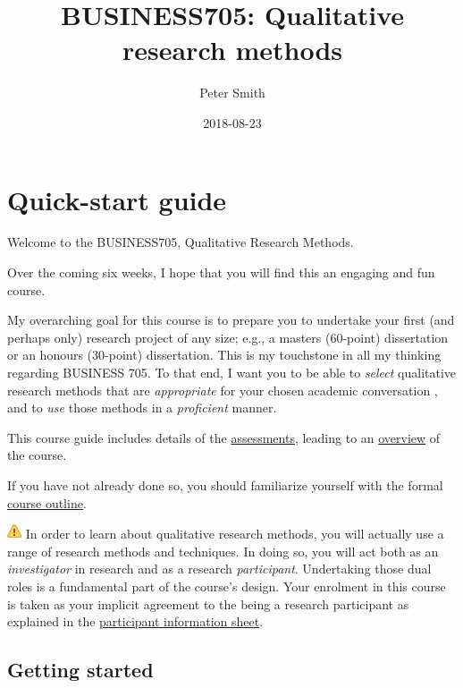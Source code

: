 \documentclass[]{book}
\title{BUSINESS705: Qualitative research methods}
\author{Peter Smith}
\date{2018-08-23}
\theoremstyle{definition}
\theoremstyle{definition}
\theoremstyle{definition}
\theoremstyle{remark}
\begin{document}
\maketitle

{
\setcounter{tocdepth}{1}
\tableofcontents
}
\hypertarget{quick-start-guide}{%
\chapter*{Quick-start guide}\label{quick-start-guide}}

Welcome to the BUSINESS705, Qualitative Research Methods.

Over the coming six weeks, I hope that you will find this an engaging
and fun course.

My overarching goal for this course is to prepare you to undertake your
first (and perhaps only) research project of any size; e.g., a masters
(60-point) dissertation or an honours (30-point) dissertation. This is
my touchstone in all my thinking regarding BUSINESS 705. To that end, I
want you to be able to \emph{select} qualitative research methods that
are \emph{appropriate} for your chosen academic conversation
\autocite{huff_2009_designingresearchpublication}, and to \emph{use}
those methods in a \emph{proficient} manner.

This course guide includes details of the
\protect\hyperlink{assessment-overview}{assessments}, leading to an
\protect\hyperlink{course-overview}{overview} of the course.

If you have not already done so, you should familiarize yourself with
the formal \protect\hyperlink{course-outline}{course outline}.

\includegraphics{images/warning.png} In order to learn about qualitative
research methods, you will actually use a range of research methods and
techniques. In doing so, you will act both as an \emph{investigator} in
research and as a research \emph{participant}. Undertaking those dual
roles is a fundamental part of the course's design. Your enrolment in
this course is taken as your implicit agreement to the being a research
participant as explained in the \protect\hyperlink{pis}{participant
information sheet}.

\hypertarget{getting-started}{%
\section*{Getting started}\label{getting-started}}
\end{document}
